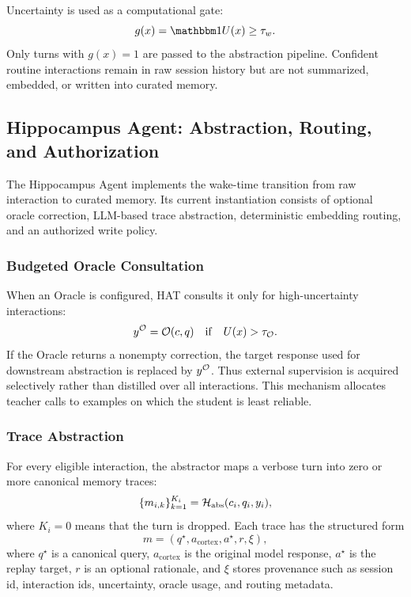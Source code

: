 Uncertainty is used as a computational gate:
\begin{equation}
  g(x)=\indicator{U(x) \ge \tau_w}.
  \label{eq:uncertainty_gate}
\end{equation}
Only turns with $g(x)=1$ are passed to the abstraction pipeline.
Confident routine interactions remain in raw session history but are not summarized, embedded, or written into curated memory.

\subsection{Hippocampus Agent: Abstraction, Routing, and Authorization}
\label{sec:method:hippocampus}

The Hippocampus Agent implements the wake-time transition from raw interaction to curated memory.
Its current instantiation consists of optional oracle correction, LLM-based trace abstraction, deterministic embedding routing, and an authorized write policy.

\subsubsection{Budgeted Oracle Consultation}
\label{sec:method:oracle}

When an Oracle is configured, HAT consults it only for high-uncertainty interactions:
\begin{equation}
  y^{\mathcal{O}}
  =
  \mathcal{O}(c,q)
  \quad\mathrm{if}\quad
  U(x) > \tau_{\mathcal{O}}.
  \label{eq:oracle_policy}
\end{equation}
If the Oracle returns a nonempty correction, the target response used for downstream abstraction is replaced by $y^{\mathcal{O}}$.
Thus external supervision is acquired selectively rather than distilled over all interactions.
This mechanism allocates teacher calls to examples on which the student is least reliable.

\subsubsection{Trace Abstraction}
\label{sec:method:abstraction}

For every eligible interaction, the abstractor maps a verbose turn into zero or more canonical memory traces:
\begin{equation}
  \{m_{i,k}\}_{k=1}^{K_i}
  =
  \mathcal{H}_{\mathrm{abs}}(c_i,q_i,y_i),
  \label{eq:trace_abstraction}
\end{equation}
where $K_i=0$ means that the turn is dropped.
Each trace has the structured form
\begin{equation}
  m
  =
  \left(
    q^{\star},
    a_{\mathrm{cortex}},
    a^{\star},
    r,
    \xi
  \right),
  \label{eq:trace_tuple}
\end{equation}
where $q^{\star}$ is a canonical query, $a_{\mathrm{cortex}}$ is the original model response, $a^{\star}$ is the replay target, $r$ is an optional rationale, and $\xi$ stores provenance such as session id, interaction ids, uncertainty, oracle usage, and routing metadata.

